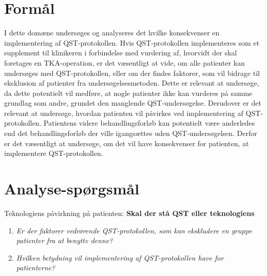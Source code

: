 \section{Formål}
I dette domæne undersøges og analyseres det hvilke konsekvenser en implementering af QST-protokollen. Hvis QST-protokollen implementeres som et supplement til klinikeren i forbindelse med vurdering af, hvorvidt der skal foretages en TKA-operation, er det væsentligt at vide, om alle patienter kan undersøges med QST-protokollen, eller om der findes faktorer, som vil bidrage til eksklusion af patienter fra undersøgelsesmetoden. Dette er relevant at undersøge, da dette potentielt vil medføre, at nogle patienter ikke kan vurderes på samme grundlag som andre, grundet den manglende QST-undersøgelse. Derudover er det relevant at undersøge, hvordan patienten vil påvirkes ved implementering af QST-protokollen. Patientens videre behandlingsforløb kan potentielt være anderledes end det behandlingsforløb der ville igangsættes uden QST-undersøgelsen. Derfor er det væsentligt at undersøge, om det vil have konsekvenser for patienten, at implementere QST-protokollen.
 
\section{Analyse-spørgsmål}
Teknologiens påvirkning på patienten: \textbf{Skal der stå QST eller teknologiens}
\begin{enumerate}
\item \textit{Er der faktorer vedrørende QST-protokollen, som kan ekskludere en gruppe patienter fra at benytte denne?} %
\item \textit{Hvilken betydning vil implementering af QST-protokollen have for patienterne?} %
\end{enumerate}

